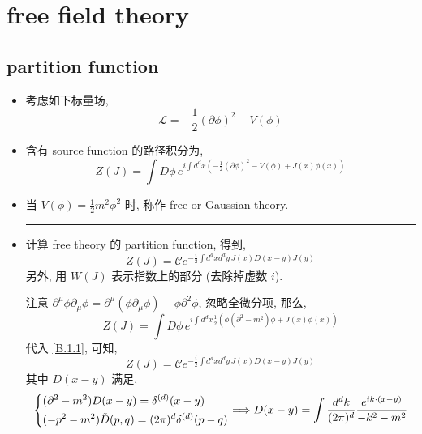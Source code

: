 \chapter{free field theory}
\section{partition function}
\begin{itemize}
	\item 考虑如下标量场,
	\begin{equation}
		\mathcal{L} = - \frac{1}{2} (\partial \phi)^2 - V(\phi)
	\end{equation}
	
	\item 含有 source function 的路径积分为,
	\begin{equation}
		Z(J) = \int D\phi \, e^{i \int d^d x (- \frac{1}{2} (\partial \phi)^2 - V(\phi) + J(x) \phi(x))}
	\end{equation}
	
	\item 当 $V(\phi) = \frac{1}{2} m^2 \phi^2$ 时, 称作 free or Gaussian theory.
	
	\noindent\rule[0.5ex]{\linewidth}{0.5pt} %
	
	\item 计算 free theory 的 partition function, 得到,
	\begin{equation} \label{1.1.3}
		Z(J) = \mathcal{C} e^{- \frac{i}{2} \int d^d x d^d y \, J(x) D(x - y) J(y)}
	\end{equation}
	另外, 用 $W(J)$ 表示指数上的部分 (去除掉虚数 $i$).
	
	\begin{tcolorbox}[title=proof:]
		注意 $\partial^\mu \phi \partial_\mu \phi = \partial^\mu(\phi \partial_\mu \phi) - \phi \partial^2 \phi$, 忽略全微分项, 那么,
		\begin{equation} \label{1.1.4}
			Z(J) = \int D\phi \, e^{i \int d^d x \frac{1}{2} (\phi (\partial^2 - m^2) \phi + J(x) \phi(x))}
		\end{equation}
		代入 \eqref{B.1.1}, 可知,
		\begin{equation}
			Z(J) = \mathcal{C} e^{- \frac{i}{2} \int d^d x d^d y \, J(x) D(x - y) J(y)}
		\end{equation}
		其中 $D(x - y)$ 满足,
		\begin{equation} \label{1.1.6}
			\begin{dcases}
				(\partial^2 - m^2) D(x - y) = \delta^{(d)}(x - y) \\
				(- p^2 - m^2) \tilde{D}(p, q) = (2 \pi)^d \delta^{(d)}(p - q)
			\end{dcases} \Longrightarrow D(x - y) = \int \frac{d^d k}{(2 \pi)^d} \frac{e^{i k \cdot (x - y)}}{- k^2 - m^2}
		\end{equation}
	\end{tcolorbox}
\end{itemize}


